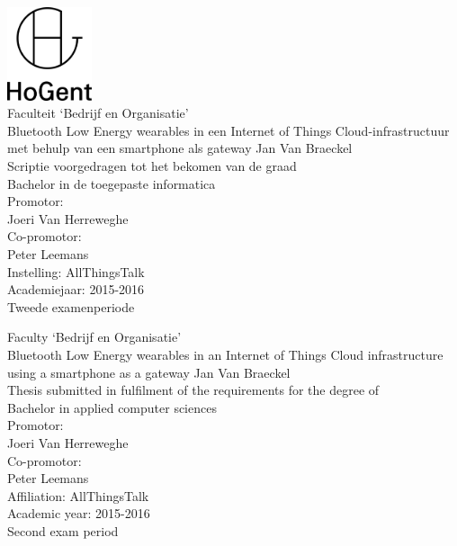 \documentclass[pdftex,a4paper,12pt,twoside]{report}
\newcommand{\emptypage}{
\newpage
\thispagestyle{empty}
\mbox{}
\newpage
}
\newcommand{\student}{Jan {Van Braeckel}}
\newcommand{\promotor}{Joeri {Van Herreweghe}}
\newcommand{\copromotor}{Peter Leemans}
\newcommand{\instelling}{AllThingsTalk}
\newcommand{\titel}{Bluetooth Low Energy wearables in een Internet of Things Cloud-infrastructuur met behulp van een smartphone als gateway}
\newcommand{\titleEN}{Bluetooth Low Energy wearables in an Internet of Things Cloud infrastructure using a smartphone as a gateway}
\newcommand{\faculteit}{Faculteit `Bedrijf en Organisatie'}
\newcommand{\faculty}{Faculty `Bedrijf en Organisatie'}
\newcommand{\rapporttype}{Scriptie voorgedragen tot het bekomen van de graad\\Bachelor in de toegepaste informatica}
\newcommand{\reporttype}{Thesis submitted in fulfilment of the requirements for the degree of\\Bachelor in applied computer sciences}
\newcommand{\academiejaar}{2015-2016}
\newcommand{\examenperiode}{Tweede examenperiode}
\newcommand{\examperiod}{Second exam period}
\begin{document}

\begin{titlepage}
  \begin{center}

    \begingroup
    \rmfamily
    \includegraphics[width=2.5cm]{img/HG-beeldmerk-woordmerk}\\[.5cm]
    \faculteit\\[3cm]
    \titel
    \vfill
    \student\\[3.5cm]
    \rapporttype\\[2cm]
    Promotor:\\
    \promotor\\
    Co-promotor:\\
    \copromotor\\[2.5cm]
    Instelling: \instelling\\[.5cm]
    Academiejaar: \academiejaar\\[.5cm]
    \examenperiode
    \endgroup

  \end{center}
  \restoregeometry
\end{titlepage}


\emptypage


\begin{titlepage}
  \begin{center}

    \begingroup
    \rmfamily
    \faculty\\[3cm]
    \titleEN
    \vfill
    \student\\[3.5cm]
    \reporttype\\[2cm]
    Promotor:\\
    \promotor\\
    Co-promotor:\\
    \copromotor\\[2.5cm]
    Affiliation: \instelling\\[.5cm]
    Academic year: \academiejaar\\[.5cm]
    \examperiod
    \endgroup

  \end{center}
  \restoregeometry
\end{titlepage}
\end{document}
